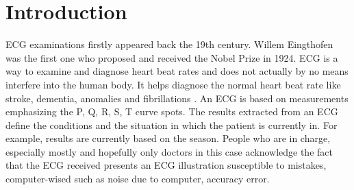 \documentclass[review]{elsarticle}
\begin{document}
\linenumbers

\section{Introduction}


ECG examinations firstly appeared back the 19th century. Willem Eingthofen was the first one who proposed and received the Nobel Prize in 1924. ECG is a way to examine and diagnose heart beat rates and does not actually by no means interfere into the human body. It helps diagnose the normal heart beat rate like stroke, dementia, anomalies and fibrillations \cite{puniaElectrographicClinicalNatural2017, staerkAtrialFibrillation2017}. 
An ECG is based on measurements emphasizing the P, Q, R, S, T curve spots. The results extracted from an ECG define the conditions and the situation in which the patient is currently in. For example, results are currently based on the season. People who are in charge, especially mostly and hopefully only doctors in this case acknowledge the fact that the ECG received presents an ECG illustration susceptible to mistakes, computer-wised such as noise \cite{osmanElectrographicPredictorsElectrographic2018, lippiGlobalEpidemiologyAtrial2021, chuaDynamicChangesCardiovascular2021} due to computer, accuracy error.
\end{document}
